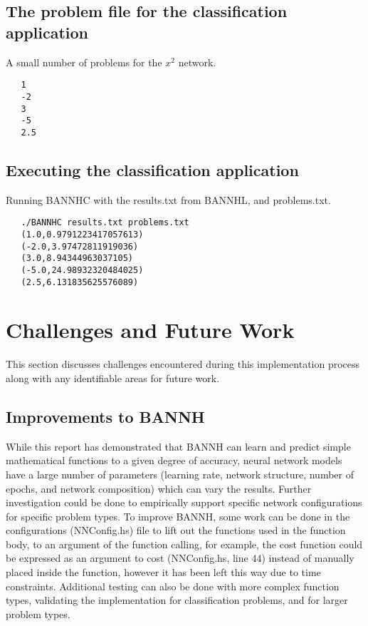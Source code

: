 \documentclass[a4paper]{article}
\newenvironment{code}{\captionsetup{type=listing}}{}
\begin{document}
\subsection{The problem file for the classification application}
A small number of problems for the $x^2$ network.
\begin{code}
   \begin{verbatim}
   1
   -2
   3
   -5
   2.5
   \end{verbatim}
\end{code}

\subsection{Executing the classification application}
Running BANNHC with the results.txt from BANNHL, and problems.txt.
\begin{code}
   \begin{verbatim}
   ./BANNHC results.txt problems.txt 
   (1.0,0.9791223417057613)
   (-2.0,3.97472811919036)
   (3.0,8.94344963037105)
   (-5.0,24.98932320484025)
   (2.5,6.131835625576089)
   \end{verbatim}
\end{code}

\section{Challenges and Future Work} \label{challenges}
This section discusses challenges encountered during this implementation 
process along with any identifiable areas for future work.

\subsection{Improvements to BANNH}
While this report has demonstrated that BANNH can learn and predict simple
mathematical functions to a given degree of accuracy, neural network models
have a large number of parameters (learning rate, network structure, number of
epochs, and network composition) which can vary the results. Further
investigation could be done to empirically support specific network
configurations for specific problem types. To improve BANNH, some work can be 
done in the configurations (NNConfig.hs) file
to lift out the functions used in the function body, to an argument of the
function calling, for example, the cost function could be expressed as an
argument to cost (NNConfig.hs, line 44) instead of manually placed inside the
function, however it has been left this way due to time constraints.
Additional testing can also be done with more complex function types,
validating the implementation for classification problems, and for larger 
problem types.
\end{document}
